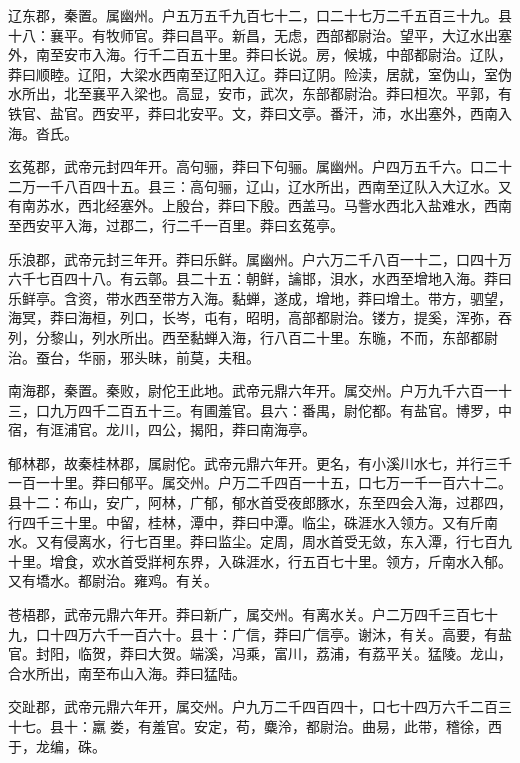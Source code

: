 \documentclass[12pt,UTF8]{ctexbook}
\begin{document}
辽东郡，秦置。属幽州。户五万五千九百七十二，口二十七万二千五百三十九。县十八：襄平。有牧师官。莽曰昌平。新昌，无虑，西部都尉治。望平，大辽水出塞外，南至安市入海。行千二百五十里。莽曰长说。房，候城，中部都尉治。辽队，莽曰顺睦。辽阳，大梁水西南至辽阳入辽。莽曰辽阴。险渎，居就，室伪山，室伪水所出，北至襄平入梁也。高显，安市，武次，东部都尉治。莽曰桓次。平郭，有铁官、盐官。西安平，莽曰北安平。文，莽曰文亭。番汗，沛，水出塞外，西南入海。沓氏。



玄菟郡，武帝元封四年开。高句骊，莽曰下句骊。属幽州。户四万五千六。口二十二万一千八百四十五。县三：高句骊，辽山，辽水所出，西南至辽队入大辽水。又有南苏水，西北经塞外。上殷台，莽曰下殷。西盖马。马訾水西北入盐难水，西南至西安平入海，过郡二，行二千一百里。莽曰玄菟亭。



乐浪郡，武帝元封三年开。莽曰乐鲜。属幽州。户六万二千八百一十二，口四十万六千七百四十八。有云鄣。县二十五：朝鲜，讑邯，浿水，水西至增地入海。莽曰乐鲜亭。含资，带水西至带方入海。黏蝉，遂成，增地，莽曰增土。带方，驷望，海冥，莽曰海桓，列口，长岑，屯有，昭明，高部都尉治。镂方，提奚，浑弥，吞列，分黎山，列水所出。西至黏蝉入海，行八百二十里。东暆，不而，东部都尉治。蚕台，华丽，邪头昧，前莫，夫租。



南海郡，秦置。秦败，尉佗王此地。武帝元鼎六年开。属交州。户万九千六百一十三，口九万四千二百五十三。有圃羞官。县六：番禺，尉佗都。有盐官。博罗，中宿，有洭浦官。龙川，四公，揭阳，莽曰南海亭。



郁林郡，故秦桂林郡，属尉佗。武帝元鼎六年开。更名，有小溪川水七，并行三千一百一十里。莽曰郁平。属交州。户万二千四百一十五，口七万一千一百六十二。县十二：布山，安广，阿林，广郁，郁水首受夜郎豚水，东至四会入海，过郡四，行四千三十里。中留，桂林，潭中，莽曰中潭。临尘，硃涯水入领方。又有斤南水。又有侵离水，行七百里。莽曰监尘。定周，周水首受无敛，东入潭，行七百九十里。增食，欢水首受牂柯东界，入硃涯水，行五百七十里。领方，斤南水入郁。又有墧水。都尉治。雍鸡。有关。



苍梧郡，武帝元鼎六年开。莽曰新广，属交州。有离水关。户二万四千三百七十九，口十四万六千一百六十。县十：广信，莽曰广信亭。谢沐，有关。高要，有盐官。封阳，临贺，莽曰大贺。端溪，冯乘，富川，荔浦，有荔平关。猛陵。龙山，合水所出，南至布山入海。莽曰猛陆。



交趾郡，武帝元鼎六年开，属交州。户九万二千四百四十，口七十四万六千二百三十七。县十：羸娄，有羞官。安定，苟，麋泠，都尉治。曲易，此带，稽徐，西于，龙编，硃。
\end{document}
